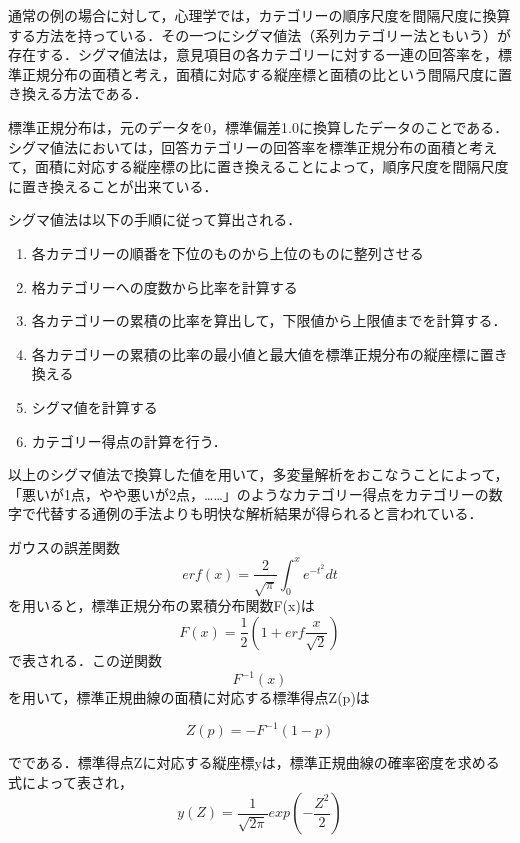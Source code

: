 \documentclass[shuuron]{kuee}
\begin{document}
通常の例の場合に対して，心理学では，カテゴリーの順序尺度を間隔尺度に換算する方法を持っている．その一つにシグマ値法（系列カテゴリー法ともいう）が存在する．シグマ値法は，意見項目の各カテゴリーに対する一連の回答率を，標準正規分布の面積と考え，面積に対応する縦座標と面積の比という間隔尺度に置き換える方法である．

標準正規分布は，元のデータを0，標準偏差1.0に換算したデータのことである．シグマ値法においては，回答カテゴリーの回答率を標準正規分布の面積と考えて，面積に対応する縦座標の比に置き換えることによって，順序尺度を間隔尺度に置き換えることが出来ている．

シグマ値法は以下の手順に従って算出される．
\begin{enumerate}
 \item 各カテゴリーの順番を下位のものから上位のものに整列させる
 \item 格カテゴリーへの度数から比率を計算する
 \item 各カテゴリーの累積の比率を算出して，下限値から上限値までを計算する．
 \item 各カテゴリーの累積の比率の最小値と最大値を標準正規分布の縦座標に置き換える
 \item シグマ値を計算する
 \item カテゴリー得点の計算を行う．
\end{enumerate}

以上のシグマ値法で換算した値を用いて，多変量解析をおこなうことによって，「悪いが1点，やや悪いが2点，……」のようなカテゴリー得点をカテゴリーの数字で代替する通例の手法よりも明快な解析結果が得られると言われている．

ガウスの誤差関数
\begin{equation}
  erf(x) = \frac{2}{\sqrt{\pi}}\int_0^x e^{-t^2} dt
\end{equation}
を用いると，標準正規分布の累積分布関数F(x)は
\begin{equation}
  F(x) = \frac{1}{2}(1+erf\frac{x}{\sqrt{2}})
\end{equation}
で表される．この逆関数\begin{equation}F^{-1}(x)\end{equation}を用いて，標準正規曲線の面積に対応する標準得点Z(p)は


\begin{equation}
  Z(p) = -F^{-1}(1-p)
\end{equation}

でである．標準得点Zに対応する縦座標yは，標準正規曲線の確率密度を求める式によって表され，
\begin{equation}
y(Z)=\frac{1}{\sqrt{2\pi}}exp(-\frac{Z^2}{2})
\end{equation}
\end{document}
